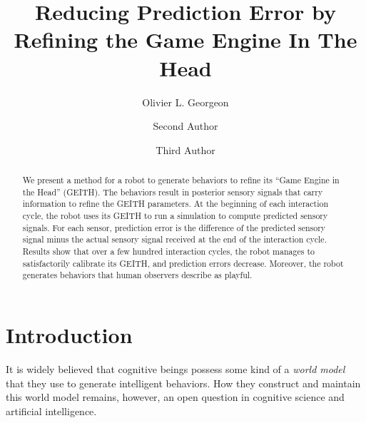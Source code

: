 \documentclass[runningheads]{llncs}
\begin{document}
%
\title{Reducing Prediction Error by Refining the Game Engine In The Head}
%
%
\author{Olivier L. Georgeon \and
Second Author \and
Third Author}
%
%
%
\maketitle              %
%
\begin{abstract}
We present a method for a robot to generate behaviors to refine its ``Game Engine in the Head'' (GEITH).
The behaviors result in posterior sensory signals that carry information to refine the GEITH parameters. 
At the beginning of each interaction cycle, the robot uses its GEITH to run a simulation to compute predicted sensory signals. 
For each sensor, prediction error is the difference of the predicted sensory signal minus the actual sensory signal received at the end of the interaction cycle. 
Results show that over a few hundred interaction cycles, the robot manages to satisfactorily calibrate its GEITH, and prediction errors decrease. 
Moreover, the robot generates behaviors that human observers describe as playful.

\end{abstract}
%
%
%
\section{Introduction}

It is widely believed that cognitive beings possess some kind of a \textit{world model} that they use to generate intelligent behaviors.
How they construct and maintain this world model remains, however,  an open question in cognitive science and artificial intelligence. 
\end{document}
